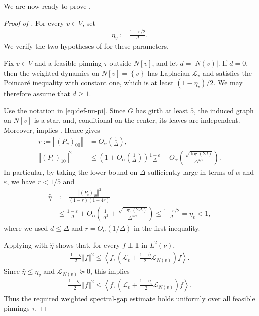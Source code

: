 \documentclass[a4paper,12pt]{article}
\theoremstyle{plain}
\theoremstyle{definition}
\def\*#1{\mathbf{#1}} %
\def\+#1{\mathcal{#1}} %
\def\*#1{\boldsymbol{#1}} %
\def\+#1{\mathcal{#1}} %
\renewcommand{\epsilon}{\varepsilon}
\newcommand{\norm}[1]{\left\Vert#1\right\Vert}
\newcommand{\set}[1]{\left\{#1\right\}}
\newcommand{\tuple}[1]{\left(#1\right)}
\newcommand{\inner}[2]{\left\langle #1,#2\right\rangle}
\newcommand{\tp}{\tuple}
\newcommand{\abs}[1]{\left\vert#1\right\vert}
\begin{document}
We are now ready to prove .
\begin{proof}[Proof of ]
For every $v\in V$, set
\begin{align*}
  \eta_v:=\frac{1-\epsilon/2}{\Delta}.
\end{align*}
We verify the two hypotheses of  for these
parameters.

Fix $v\in V$ and a feasible pinning $\tau$ outside $N[v]$, and let
$d=\abs{N(v)}$.  If $d=0$, then the weighted dynamics on $N[v]=\set{v}$
has Laplacian $\+L_v$ and satisfies the Poincar{\'e} inequality with
constant one, which is at least $(1-\eta_v)/2$.  We may therefore assume
that $d\geq1$.

Use the notation in \eqref{eq:def-nu-pi}.  Since $G$ has girth at least
$5$, the induced graph on $N[v]$ is a star, and, conditional on the
center, its leaves are independent.  Moreover,
 implies
.  Hence
 gives
\begin{align*}
  r:=\norm{(P_v)_{00}}
  &=O_\alpha\tp{\frac1\Delta},
  \\
  \norm{(P_v)_{10}}^2
  &\leq
  \tp{1+O_\alpha\tp{\frac1\Delta}}
  \frac{1-\epsilon}{\Delta}
  +O_\alpha\tp{
    \frac{\sqrt{\log(2d)}}{\Delta^{3/2}}
  }.
\end{align*}
In particular, by taking the lower bound on $\Delta$ sufficiently large
in terms of $\alpha$ and $\epsilon$, we have $r<1/5$ and
\begin{align*}
  \widehat\eta
  &:=\frac{\norm{(P_v)_{10}}^2}{(1-r)(1-4r)}
  \\
  &\leq
  \frac{1-\epsilon}{\Delta}
  +O_\alpha\tp{
    \frac1{\Delta^2}
    +\frac{\sqrt{\log(2\Delta)}}{\Delta^{3/2}}
  }
  \leq
  \frac{1-\epsilon/2}{\Delta}
  =\eta_v<1,
\end{align*}
where we used $d\leq\Delta$ and $r=O_\alpha(1/\Delta)$ in the first
inequality.

Applying  with $\widehat\eta$ shows that,
for every $f\perp\*1$ in $L^2(\nu)$,
\begin{align*}
  \frac{1-\widehat\eta}{2}\norm{f}^2
  \leq
  \inner{f}{\tp{
    \+L_v+\frac{1+\widehat\eta}{2}\+L_{N(v)}
  }f}.
\end{align*}
Since $\widehat\eta\leq\eta_v$ and $\+L_{N(v)}\succeq0$, this implies
\begin{align*}
  \frac{1-\eta_v}{2}\norm{f}^2
  \leq
  \inner{f}{\tp{
    \+L_v+\frac{1+\eta_v}{2}\+L_{N(v)}
  }f}.
\end{align*}
Thus the required weighted spectral-gap estimate holds uniformly over
all feasible pinnings $\tau$.


\end{proof}
\end{document}
